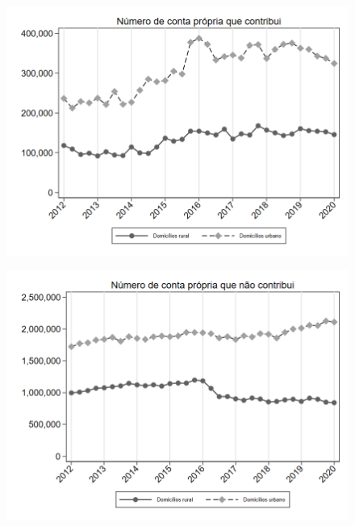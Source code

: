\begin{frame}[label=_composicao_demografica_rural_urbano_n_cpropriaC]{}
\textit{\hyperlink{_composicao_demografica_rural_urbano}{}}
\begin{figure}
  \centering
  \includegraphics[width=1.0\linewidth]{../../analysis/output/composicao_demografica/area_geografica/_composicao_demografica_rural_urbano_n_cpropriaC.png}
  \caption{}
  \label{fig:_composicao_demografica_rural_urbano_n_cpropriaC}
\end{figure}
\end{frame}

\begin{frame}[label=_composicao_demografica_rural_urbano_n_cpropriaNc]{}
\textit{\hyperlink{_composicao_demografica_rural_urbano}{}}
\begin{figure}
  \centering
  \includegraphics[width=1.0\linewidth]{../../analysis/output/composicao_demografica/area_geografica/_composicao_demografica_rural_urbano_n_cpropriaNc.png}
  \caption{}
  \label{fig:_composicao_demografica_rural_urbano_n_cpropriaNc}
\end{figure}
\end{frame}